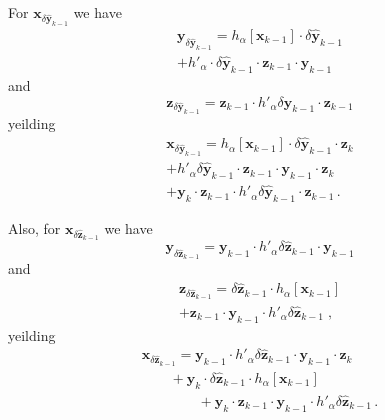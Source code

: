 \documentclass[letterpaper,twocolumn,amsmath,amsfont,amssymb,english,aps,jcp,preprintnumbers,groupaddress,nofootinbib,tightenlines]{revtex4}
\newcommand{\mat}[1]{\boldsymbol{#1}}
\begin{document}
For $\mat{x}_{\delta \widehat{ \mat{y}}_{k-1}}$ we have
\begin{multline}
 \mat{y}_{\delta \widehat{ \mat{y}}_{k-1}} = h_\alpha \left[ \mat{x}_{k-1} \right] \cdot \delta \widehat{\mat{y}}_{k-1} \\
                                     + h'_\alpha \cdot \delta \widehat{\mat{y}}_{k-1} \cdot \mat{z}_{k-1} \cdot \mat{y}_{k-1}
\end{multline}
and
\begin{equation}
 \mat{z}_{\delta \widehat{ \mat{y}}_{k-1}} =  \mat{z}_{k-1} \cdot h'_\alpha \delta \widehat{\mat{y}}_{k-1} \cdot \mat{z}_{k-1}
\end{equation}
yeilding
\begin{multline}
 \mat{x}_{\delta \widehat{ \mat{y}}_{k-1}} = h_\alpha \left[ \mat{x}_{k-1} \right]  \cdot \delta \widehat{\mat{y}}_{k-1} \cdot \mat{z}_{k} \\
+  h'_\alpha  \delta \widehat{\mat{y}}_{k-1} \cdot \mat{z}_{k-1} \cdot  \mat{y}_{k-1} \cdot  \mat{z}_{k} \\
+ \mat{y}_{k} \cdot \mat{z}_{k-1} \cdot h'_\alpha \delta \widehat{\mat{y}}_{k-1} \cdot \mat{z}_{k-1}  \, .
\end{multline}

Also, for $\mat{x}_{\delta \widehat{ \mat{z}}_{k-1}}$ we have
\begin{equation}
 \mat{y}_{\delta \widehat{ \mat{z}}_{k-1}} =  {\mat{y}}_{k-1} \cdot  h'_\alpha \delta \widehat{ \mat{z}}_{k-1} \cdot  \mat{y}_{k-1}
\end{equation}
and
\begin{multline}
 \mat{z}_{\delta \widehat{ \mat{z}}_{k-1}} = \delta \widehat{\mat{z}}_{k-1} \cdot   h_\alpha \left[ \mat{x}_{k-1} \right] \\
                                     + \mat{z}_{k-1} \cdot {\mat{y}}_{k-1} \cdot h'_\alpha \delta \widehat{\mat{z}}_{k-1}  \; ,
\end{multline}
yeilding
\begin{multline}
 \mat{x}_{\delta \widehat{ \mat{z}}_{k-1}} =  {\mat{y}}_{k-1} \cdot  h'_\alpha \delta \widehat{ \mat{z}}_{k-1} \cdot  \mat{y}_{k-1}  \cdot \mat{z}_{k} \\
\qquad + \mat{y}_k \cdot  \delta \widehat{\mat{z}}_{k-1} \cdot   h_\alpha \left[ \mat{x}_{k-1} \right] \\
\qquad \qquad +  \mat{y}_{k} \cdot  \mat{z}_{k-1} \cdot {\mat{y}}_{k-1} \cdot h'_\alpha \delta \widehat{\mat{z}}_{k-1} \, .
\end{multline}
\end{document}
